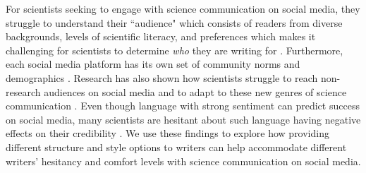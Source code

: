 For scientists seeking to engage with science communication on social media, they struggle to understand their ``audience" which consists of readers from diverse backgrounds, levels of scientific literacy, and preferences which makes it challenging for scientists to determine \textit{who} they are writing for \cite{rice2017contexts, schafer2017changing, williams2022hci}. Furthermore, each social media platform has its own set of community norms and demographics \cite{pewresearchFactsAbout, oktay2014demographic}. Research has also shown how scientists struggle to reach non-research audiences on social media and to adapt to these new genres of science communication \cite{cote2018scientists, kopke2019stepping, lorono2018responsibility, koivumaki2020social}. Even though language with strong sentiment can predict success on social media, many scientists are hesitant about such language having negative effects on their credibility \cite{yuan2020s, yuan2019should, gilbert2020run}. We use these findings to explore how providing different structure and style options to writers can help accommodate different writers' hesitancy and comfort levels with science communication on social media. 








